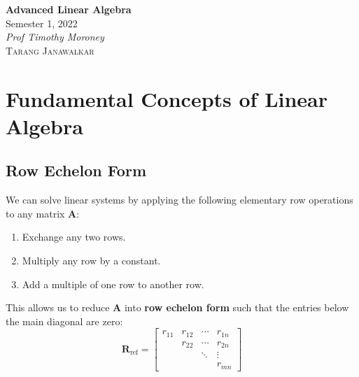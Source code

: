 \documentclass{article}
\date{}
\newcommand{\unitName}{Advanced Linear Algebra}
\newcommand{\unitTime}{Semester 1, 2022}
\newcommand{\unitCoordinator}{Prof Timothy Moroney}
\newcommand{\documentAuthors}{\textsc{Tarang Janawalkar}}
\begin{document}
%
\begin{titlepage}
    \vspace*{\fill}
    \begin{center}
        \LARGE{\textbf{\unitName}} \\[0.1in]
        \normalsize{\unitTime} \\[0.2in]
        \normalsize\textit{\unitCoordinator} \\[0.2in]
        \documentAuthors
    \end{center}
    \vspace*{\fill}
    \doclicenseThis
    \thispagestyle{empty}
\end{titlepage}
\newpage
%
\tableofcontents
\newpage
%
\section{Fundamental Concepts of Linear Algebra}
\subsection{Row Echelon Form}
We can solve linear systems by applying the following elementary row
operations to any matrix \(\symbf{A}\):
\begin{enumerate}[label=Type \Roman*.]
    \item Exchange any two rows.
    \item Multiply any row by a constant.
    \item Add a multiple of one row to another row.
\end{enumerate}
This allows us to reduce \(\symbf{A}\) into \textbf{row echelon form}
such that the entries below the main diagonal are zero:
\begin{equation*}
    \symbf{R}_{\mathrm{ref}} =
    \begin{bmatrix}
        r_{11} & r_{12} & \cdots & r_{1n} \\
               & r_{22} & \cdots & r_{2n} \\
               &        & \ddots & \vdots \\
               &        &        & r_{mn}
    \end{bmatrix}
\end{equation*}
\end{document}
